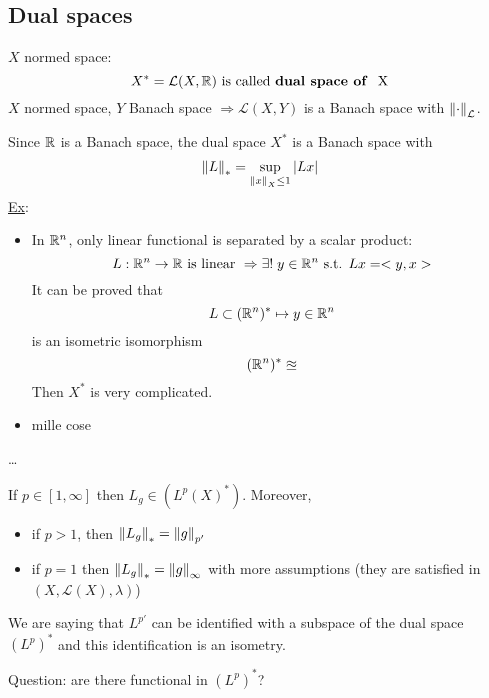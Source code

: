 \subsection*{Dual spaces}
\(X\) normed space: 
\[
    X^* = \mathcal{L}(X, \mathbb{R}) \mbox{ is called \textbf{dual space of } X}
\]
\(X\) normed space, \(Y\) Banach space \(\Rightarrow \mathcal{L}(X, Y)\) is a Banach space with \(\norm{\cdot}_{\mathcal{L}}\).

Since \(\mathbb{R}\) is a Banach space, the dual space \(X^*\) is a Banach space with 
\[
    \norm{L}_* = \sup_{\norm{x}_X \leq 1} \abs{Lx}
\]
\underline{Ex}: 
\begin{itemize}
    \item In \(\mathbb{R}^n\), only linear functional is separated by a scalar product:
        \[
            L : \mathbb{R}^n \to \mathbb{R} \mbox{ is linear } \Rightarrow \exists ! \; y \in \mathbb{R}^n \mbox{ s.t. } Lx = <y,x>
        \]
        It can be proved that 
        \[
            L \subset (\mathbb{R}^n)^* \mapsto y \in \mathbb{R}^n
        \]
        is an isometric isomorphism 
        \[
            (\mathbb{R}^n)^* \approxeq 
        \]
        Then \(X^*\) is very complicated.
    \item mille cose 
\end{itemize}

\dots

\begin{proposition}
    If \(p \in [1, \infty]\) then \(L_g \in (L^p(X)^*)\). Moreover, 
    \begin{itemize}
        \item if \(p > 1\), then \(\norm{L_g}_* = \norm{g}_{p'}\)
        \item if \(p=1\) then \(\norm{L_g}_* = \norm{g}_{\infty}\) with more assumptions (they are satisfied in \((X, \mathcal{L}(X), \lambda)\))
    \end{itemize}
\end{proposition}

\begin{remark}
    We are saying that \(L^{p'}\) can be identified with a subspace of the dual space \((L^p)^*\) and this identification is an isometry.
\end{remark}

Question: are there functional in \((L^p)^*\)?

